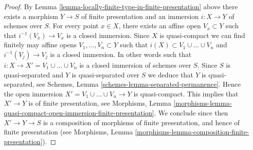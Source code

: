 \documentclass[10pt,a4paper]{amsart}
\theoremstyle{plain}
\theoremstyle{definition}
\theoremstyle{remark}
\numberwithin{equation}{subsection}
\begin{document}
\begin{proof}
By Lemma \ref{lemma-locally-finite-type-in-finite-presentation} above
there exists a morphism $Y \to S$ of finite presentation and an
immersion $i : X \to Y$ of schemes over $S$.
For every point $x \in X$, there exists an affine open
$V_x \subset Y$ such that $i^{-1}(V_x) \to V_x$ is a
closed immersion. Since $X$ is quasi-compact we can find
finitely may affine opens $V_1, \ldots, V_n \subset Y$
such that $i(X) \subset V_1 \cup \ldots \cup V_n$ and
$i^{-1}(V_j) \to V_j$ is a closed immersion. In other words
such that $i : X \to X' = V_1 \cup \ldots \cup V_n$ is a
closed immersion of schemes over $S$.
Since $S$ is quasi-separated and $Y$ is quasi-separated over $S$
we deduce that $Y$ is quasi-separated, see
Schemes, Lemma \ref{schemes-lemma-separated-permanence}.
Hence the open immersion $X' = V_1 \cup \ldots \cup V_n \to Y$
is quasi-compact. This implies that
$X' \to Y$ is of finite presentation, see
Morphisms,
Lemma \ref{morphisms-lemma-quasi-compact-open-immersion-finite-presentation}.
We conclude since then $X' \to Y \to S$ is a composition of morphisms
of finite presentation, and hence of finite presentation (see
Morphisms, Lemma \ref{morphisms-lemma-composition-finite-presentation}).
\end{proof}
\end{document}
